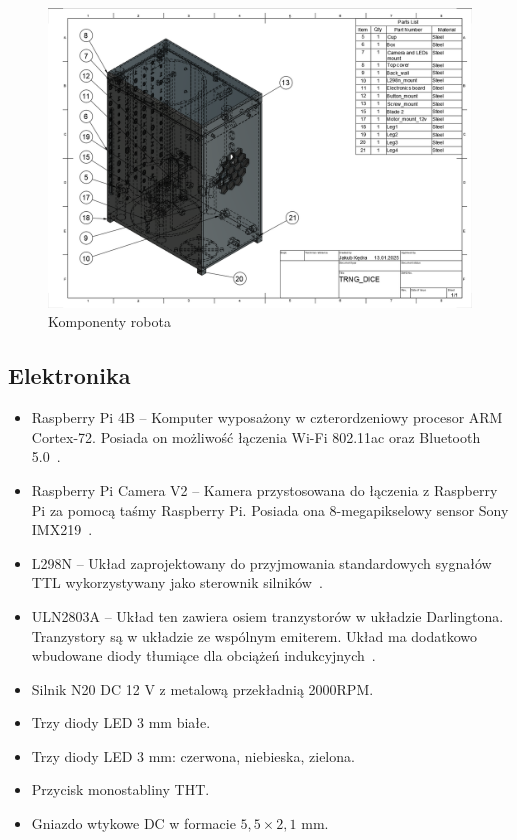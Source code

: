     \begin{figure}[H]
        \centering
        \includegraphics[width=0.95\linewidth]{chapters/03-praca-wlasna/figures/komponenty}
        \caption{\label{fig:komponenty}Komponenty robota}
    \end{figure}

\subsection{Elektronika}
    \begin{itemize}
        \item Raspberry Pi 4B -- Komputer wyposażony w czterordzeniowy procesor ARM Cortex-72. Posiada on możliwość łączenia Wi-Fi 802.11ac oraz Bluetooth 5.0~\cite{malina}.
        \item Raspberry Pi Camera V2 -- Kamera przystosowana do łączenia z Raspberry Pi za pomocą taśmy Raspberry Pi. Posiada ona 8-megapikselowy sensor Sony IMX219~\cite{malina}.
        \item L298N -- Układ zaprojektowany do przyjmowania standardowych sygnałów TTL wykorzystywany jako sterownik silników~\cite{L298}.
        \item ULN2803A -- Układ ten zawiera osiem tranzystorów w układzie Darlingtona. Tranzystory są w układzie ze wspólnym emiterem. Układ ma dodatkowo wbudowane diody tłumiące dla obciążeń indukcyjnych~\cite{ULN2803a}.
        \item Silnik N20 DC 12 V z metalową przekładnią 2000RPM.
        \item Trzy diody LED 3 mm białe.
        \item Trzy diody LED 3 mm: czerwona, niebieska, zielona.
        \item Przycisk monostabliny THT.
        \item Gniazdo wtykowe DC w formacie $5,5 \times 2,1$ mm.
    \end{itemize}


